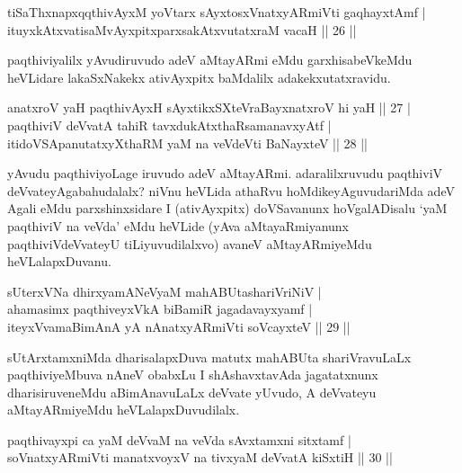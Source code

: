 \begin{shl}
tiSaThxnapxqqthivAyxM yoV\s tarx sAyxtosxV\s natxyARmiVti  gaqhayxtAmf |\\
ituyxkAtxvatisaMvAyxpitxparxsakAtxvutatxraM vacaH \hfill || 26 ||
\end{shl}

\begin{artha}
paqthiviyalilx yAvudiruvudo adeV aMtayARmi eMdu garxhisabeVkeMdu heVLidare lakaSxNakekx ativAyxpitx baMdalilx adakekx\break utatxravidu.
\end{artha}


\begin{shl}
anatxroV yaH paqthivAyxH sAyxtikxSXteVraBayxnatxroV hi yaH \hfill || 27 |\\
paqthiviV deVvatA tahiR tavxdukAtxthaRsamanavxyAtf |\\
itidoVSApanutatxyXthaRM yaM na veVdeVti BaNayxteV \hfill || 28 ||
\end{shl}

\begin{artha}
yAvudu paqthiviyoLage iruvudo adeV aMtayARmi. adaralilxruvudu paqthiviV deVvateyAgabahudalalx? niVnu heVLida athaRvu hoMdikeyAguvudariMda adeV Agali eMdu parxshinxsidare I (ativAyxpitx) doVSavanunx hoVgalADisalu `yaM paqthiviV na veVda' eMdu heVLide (yAva aMtayaRmiyanunx paqthiviVdeVvateyU tiLiyuvudilalxvo) avaneV aMtayARmiyeMdu heVLalapxDuvanu.
\end{artha}

\begin{shl}
sUterxVNa dhirxyamANeVyaM mahABUtashariVriNiV |\\
ahamasimx paqthiveyxVkA biBamiR jagadavayxyamf  |\\ 
iteyxVvamaBimAnA yA nAnatxyARmiVti soVcayxteV \hfill || 29 ||
\end{shl}

\begin{artha}
sUtArxtamxniMda dharisalapxDuva matutx mahABUta shariVravuLaLx paqthiviyeMbuva nAneV obabxLu I shAshavxtavAda jagatatxnunx dharisiruveneMdu aBimAnavuLaLx deVvate yUvudo, A deVvateyu aMtayARmiyeMdu heVLalapxDuvudilalx.
\end{artha}

\begin{shl}
paqthivayxpi ca yaM deVvaM na veVda sAvxtamxni sitxtamf |\\
soV\s natxyARmiVti manatxvoyxV na tivxyaM deVvatA kiSxtiH \hfill || 30 ||
\end{shl}

